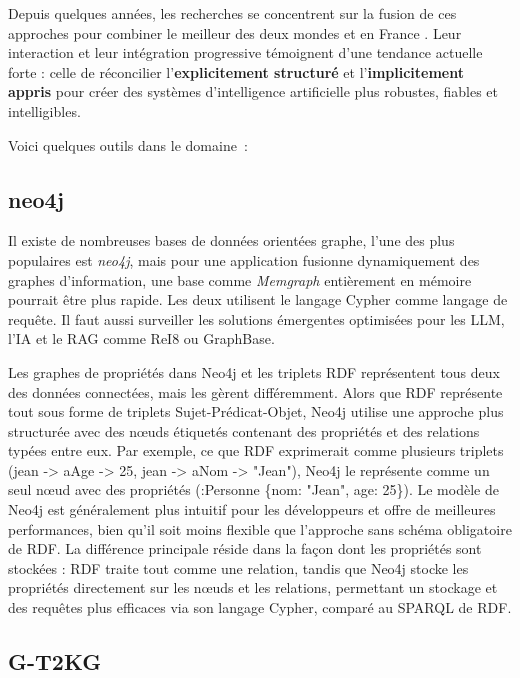 \documentclass[a4paper,11pt]{report}
\begin{document}
Depuis quelques années, les recherches se concentrent sur la fusion de ces approches pour combiner le meilleur des deux mondes \citep{8U2Q2H5E,8XXG9DKM,HFQGE3UK,MNQFVIVR,D7EXWP53,THNWVF3G,E42E7D4X,AZ5B27ML} et en France \citep{TDG5RFPC,MZNGHBPG}. Leur interaction et leur intégration progressive témoignent d'une tendance actuelle forte : celle de réconcilier l'{}\textbf{\textbf{explicitement structuré}} et l'{}\textbf{\textbf{implicitement appris}} pour créer des systèmes d'intelligence artificielle plus robustes, fiables et intelligibles.

Voici quelques outils dans le domaine~:

\subsection{neo4j}\label{neo4j}

Il existe de nombreuses bases de données orientées graphe, l'une des plus populaires est \emph{\emph{neo4j}}, mais pour une application fusionne dynamiquement des graphes d'information, une base comme \emph{\emph{Memgraph }}entièrement en mémoire pourrait être plus rapide. Les deux utilisent le langage Cypher comme langage de requête. Il faut aussi surveiller les solutions émergentes optimisées pour les LLM, l'IA et le RAG comme ReI8 ou GraphBase.

Les graphes de propriétés dans Neo4j et les triplets RDF représentent tous deux des données connectées, mais les gèrent différemment. Alors que RDF représente tout sous forme de triplets Sujet-Prédicat-Objet, Neo4j utilise une approche plus structurée avec des nœuds étiquetés contenant des propriétés et des relations typées entre eux. Par exemple, ce que RDF exprimerait comme plusieurs triplets (jean -\textgreater{} aAge -\textgreater{} 25, jean -\textgreater{} aNom -\textgreater{} "Jean"), Neo4j le représente comme un seul nœud avec des propriétés (:Personne \{nom: "Jean", age: 25\}). Le modèle de Neo4j est généralement plus intuitif pour les développeurs et offre de meilleures performances, bien qu'il soit moins flexible que l'approche sans schéma obligatoire de RDF. La différence principale réside dans la façon dont les propriétés sont stockées : RDF traite tout comme une relation, tandis que Neo4j stocke les propriétés directement sur les nœuds et les relations, permettant un stockage et des requêtes plus efficaces via son langage Cypher, comparé au SPARQL de RDF.

\subsection{G-T2KG}\label{g-t2kg}
\end{document}
